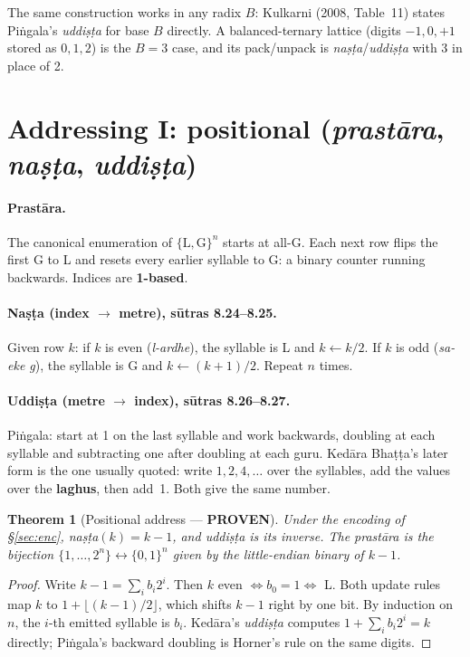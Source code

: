 \documentclass[11pt,letterpaper]{article}
\newcommand{\tagbox}[2]{\textsf{\textbf{\color{#1}#2}}}
\newcommand{\PROVEN}{\tagbox{tagproven}{PROVEN}}
\newcommand{\skt}[1]{\textit{#1}}
\theoremstyle{plain}
\newtheorem{theorem}{Theorem}
\theoremstyle{remark}
\begin{document}
The same construction works in any radix $B$: Kulkarni (2008, Table~11) states Piṅgala's \skt{uddiṣṭa} for base $B$ directly. A balanced-ternary lattice (digits $-1,0,+1$ stored as $0,1,2$) is the $B=3$ case, and its pack/unpack is \skt{naṣṭa}/\skt{uddiṣṭa} with 3 in place of 2.

\section{Addressing I: positional (\skt{prastāra}, \skt{naṣṭa}, \skt{uddiṣṭa})}\label{sec:pos}

\paragraph{Prastāra.} The canonical enumeration of $\{\mathrm{L},\mathrm{G}\}^n$ starts at all-G. Each next row flips the first G to L and resets every earlier syllable to G: a binary counter running backwards. Indices are \textbf{1-based}.

\paragraph{Naṣṭa (index $\to$ metre), sūtras 8.24--8.25.} Given row $k$: if $k$ is even (\skt{l-ardhe}), the syllable is L and $k \leftarrow k/2$. If $k$ is odd (\skt{sa-eke g}), the syllable is G and $k \leftarrow (k+1)/2$. Repeat $n$ times.

\paragraph{Uddiṣṭa (metre $\to$ index), sūtras 8.26--8.27.} Piṅgala: start at 1 on the last syllable and work backwards, doubling at each syllable and subtracting one after doubling at each guru. Kedāra Bhaṭṭa's later form is the one usually quoted: write $1,2,4,\dots$ over the syllables, add the values over the \textbf{laghus}, then add~1. Both give the same number.

\begin{theorem}[Positional address \textup{---} \PROVEN]\label{thm:pos}
Under the encoding of §\ref{sec:enc}, \skt{naṣṭa}$(k) = k-1$, and \skt{uddiṣṭa} is its inverse. The \skt{prastāra} is the bijection $\{1,\dots,2^n\} \leftrightarrow \{0,1\}^n$ given by the little-endian binary of $k-1$.
\end{theorem}
\begin{proof}
Write $k-1 = \sum_i b_i 2^i$. Then $k$ even $\iff b_0 = 1 \iff$ L. Both update rules map $k$ to $1 + \lfloor (k-1)/2 \rfloor$, which shifts $k-1$ right by one bit. By induction on $n$, the $i$-th emitted syllable is $b_i$. Kedāra's \skt{uddiṣṭa} computes $1 + \sum_i b_i 2^i = k$ directly; Piṅgala's backward doubling is Horner's rule on the same digits.
\end{proof}
\end{document}
